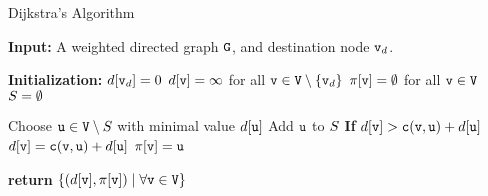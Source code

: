 






\begin{algorithm}
\caption{Dijkstra's Algorithm}
\label{Alg:Dijkstra}
\begin{algorithmic}[1]
\State \textbf{Input:} A weighted directed graph ${\tt G}$, and destination node ${\tt v}_d$.

\State \textbf{Initialization:} 
\State \quad $d[{\tt v}_d] = 0$
\State \quad $d[{\tt v}] = \infty$ for all ${\tt v} \in {\tt V} \setminus \{{\tt v}_d\}$
\State \quad $\pi[{\tt v}] = \emptyset$ for all ${\tt v} \in {\tt V}$
\State \quad ${S} = \emptyset$

\While{$\vertexset \neq \nodes$}
    \State Choose ${\tt u} \in {\tt V} \setminus {S}$ with minimal value $d[{\tt u}]$
    \State Add ${\tt u}$ to ${S}$
    \ForAll{$(\nodev, \nodeu) \in \edges$}
        \State \textbf{If} {$d[{\tt v}] > {\tt c}({\tt v}, {\tt u}) + d[{\tt u}]$}
            \State \quad $d[{\tt v}] = {\tt c}({\tt v}, {\tt u}) + d[{\tt u}]$
            \State \quad $\pi[{\tt v}] = {\tt u}$
    \EndFor
\EndWhile

\State \textbf{return} $\{(d[{\tt v}], \pi[{\tt v}]) \mid \forall {\tt v} \in {\tt V}\}$
\end{algorithmic}
\end{algorithm}

